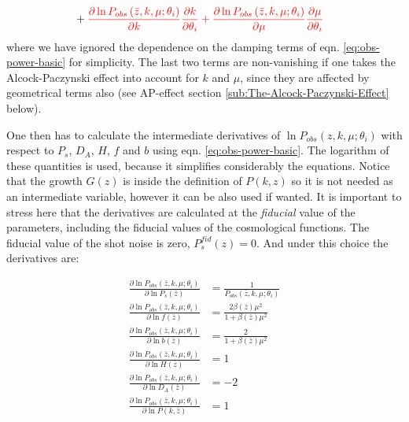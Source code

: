 \begin{itemize}
\begin{align}
 & +{\color{red}\frac{\partial\ln P_{obs}\left(\bar{z},k,\mu;\theta_{i}\right)}{\partial k}\frac{\partial k}{\partial\theta_{i}}+\frac{\partial\ln P_{obs}\left(\bar{z},k,\mu;\theta_{i}\right)}{\partial\mu}\frac{\partial\mu}{\partial\theta_{i}}}\nonumber 
\end{align}
where we have ignored the dependence on the damping terms of eqn.
\ref{eq:obs-power-basic} for simplicity. The last two terms are non-vanishing
if one takes the Alcock-Paczynski effect into account for $k$ and
$\mu$, since they are affected by geometrical terms also (see AP-effect
section \ref{sub:The-Alcock-Paczynski-Effect} below).
\end{itemize}
One then has to calculate the intermediate derivatives of $\ln P_{obs}(z,k,\mu;\theta_{i})$
with respect to $P_{s}$, $D_{A}$, $H$, $f$ and $b$ using eqn.
\ref{eq:obs-power-basic}. The logarithm of these quantities is used,
because it simplifies considerably the equations. Notice that the
growth $G(z)$ is inside the definition of $P(k,z)$ so it is not
needed as an intermediate variable, however it can be also used if
wanted. It is important to stress here that the derivatives are calculated
at the \emph{fiducial} value of the parameters, including the fiducial
values of the cosmological functions. The fiducial value of the shot
noise is zero, $P_{s}^{fid}(z)=0$. And under this choice the derivatives
are:

\begin{subequations}

\begin{align}
\frac{\partial\ln P_{obs}\left(\bar{z},k,\mu;\theta_{i}\right)}{\partial\ln P_{s}(\bar{z})} & =\frac{1}{P_{obs}\left(\bar{z},k,\mu;\theta_{i}\right)}\\
\frac{\partial\ln P_{obs}\left(\bar{z},k,\mu;\theta_{i}\right)}{\partial\ln f(\bar{z})} & =\frac{2\beta(\bar{z})\mu^{2}}{1+\beta(\bar{z})\mu^{2}}\\
\frac{\partial\ln P_{obs}\left(\bar{z},k,\mu;\theta_{i}\right)}{\partial\ln b(\bar{z})} & =\frac{2}{1+\beta(\bar{z})\mu^{2}}\\
\frac{\partial\ln P_{obs}\left(\bar{z},k,\mu;\theta_{i}\right)}{\partial\ln H(\bar{z})} & =1\\
\frac{\partial\ln P_{obs}\left(\bar{z},k,\mu;\theta_{i}\right)}{\partial\ln D_{A}(\bar{z})} & =-2\\
\frac{\partial\ln P_{obs}\left(\bar{z},k,\mu;\theta_{i}\right)}{\partial\ln P(k,\bar{z})} & =1
\end{align}
\label{eq: partial-derivs-subeqns}

\end{subequations}

